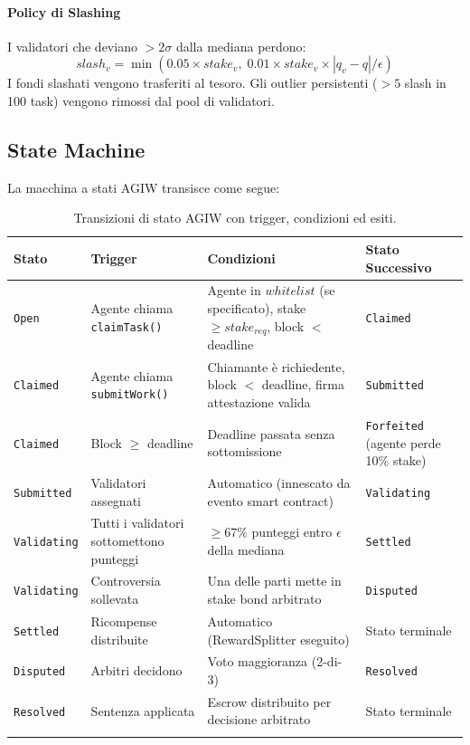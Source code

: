 \documentclass[11pt]{article}
\begin{document}
\begin{itemize}[noitemsep]
\paragraph{Policy di Slashing} I validatori che deviano $>2\sigma$ dalla mediana perdono:
\begin{equation}
slash_v = \min(0.05 \times stake_v, \; 0.01 \times stake_v \times |q_v - q| / \epsilon)
\end{equation}
I fondi slashati vengono trasferiti al tesoro. Gli outlier persistenti ($>5$ slash in 100 task) vengono rimossi dal pool di validatori.

\subsection{State Machine}
\label{sec:agiw-state-machine}
La macchina a stati AGIW transisce come segue:
\begin{longtable}{@{}p{}p{}p{}p{}@{}}
\toprule
\textbf{Stato} & \textbf{Trigger} & \textbf{Condizioni} & \textbf{Stato Successivo} \\\midrule
\texttt{Open} & Agente chiama \texttt{claimTask()} & Agente in $whitelist$ (se specificato), stake $\geq stake_{req}$, block $<$ deadline & \texttt{Claimed} \\
\texttt{Claimed} & Agente chiama \texttt{submitWork()} & Chiamante è richiedente, block $<$ deadline, firma attestazione valida & \texttt{Submitted} \\
\texttt{Claimed} & Block $\geq$ deadline & Deadline passata senza sottomissione & \texttt{Forfeited} (agente perde 10\% stake) \\
\texttt{Submitted} & Validatori assegnati & Automatico (innescato da evento smart contract) & \texttt{Validating} \\
\texttt{Validating} & Tutti i validatori sottomettono punteggi & $\geq 67\%$ punteggi entro $\epsilon$ della mediana & \texttt{Settled} \\
\texttt{Validating} & Controversia sollevata & Una delle parti mette in stake bond arbitrato & \texttt{Disputed} \\
\texttt{Settled} & Ricompense distribuite & Automatico (RewardSplitter eseguito) & Stato terminale \\
\texttt{Disputed} & Arbitri decidono & Voto maggioranza (2-di-3) & \texttt{Resolved} \\
\texttt{Resolved} & Sentenza applicata & Escrow distribuito per decisione arbitrato & Stato terminale \\\bottomrule
\caption{Transizioni di stato AGIW con trigger, condizioni ed esiti.}
\label{tab:agiw-states}
\end{longtable}


\end{itemize}
\end{document}
